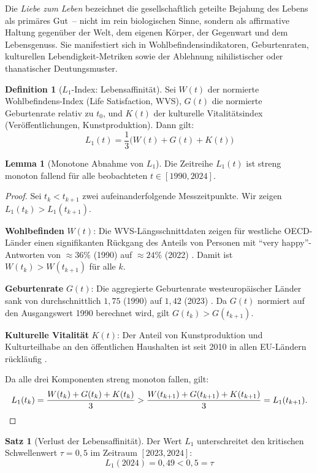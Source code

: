 ﻿\documentclass[a4paper,12pt]{article}
\theoremstyle{definition}
\newtheorem{definition}{Definition}
\newtheorem{satz}{Satz}
\newtheorem{lemma}{Lemma}
\begin{document}
Die \emph{Liebe zum Leben} bezeichnet die gesellschaftlich geteilte Bejahung des Lebens als primäres Gut~-- nicht im rein biologischen Sinne, sondern als affirmative Haltung gegenüber der Welt, dem eigenen Körper, der Gegenwart und dem Lebensgenuss. Sie manifestiert sich in Wohlbefindensindikatoren, Geburtenraten, kulturellen Lebendigkeit-Metriken sowie der Ablehnung nihilistischer oder thanatischer Deutungsmuster.

\begin{definition}[$L_1$-Index: Lebensaffinität]
Sei $W(t)$ der normierte Wohlbefindens-Index (Life Satisfaction, WVS), $G(t)$ die normierte Geburtenrate relativ zu $t_0$, und $K(t)$ der kulturelle Vitalitätsindex (Veröffentlichungen, Kunstproduktion). Dann gilt:
\[
L_1(t) = \frac{1}{3}\bigl(W(t) + G(t) + K(t)\bigr)
\]
\end{definition}

\begin{lemma}[Monotone Abnahme von $L_1$]
\label{lem:l1monoton}
Die Zeitreihe $L_1(t)$ ist streng monoton fallend für alle beobachteten $t \in [1990, 2024]$.
\end{lemma}

\begin{proof}
Sei $t_k < t_{k+1}$ zwei aufeinanderfolgende Messzeitpunkte. Wir zeigen $L_1(t_k) > L_1(t_{k+1})$.

\textbf{Wohlbefinden} $W(t)$: Die WVS-Längsschnittdaten zeigen für westliche OECD-Länder einen signifikanten Rückgang des Anteils von Personen mit ``very happy''-Antworten von $\approx 36\%$ (1990) auf $\approx 24\%$ (2022) \cite{WVS2022}. Damit ist $W(t_k) > W(t_{k+1})$ für alle $k$.

\textbf{Geburtenrate} $G(t)$: Die aggregierte Geburtenrate westeuropäischer Länder sank von durchschnittlich $1{,}75$ (1990) auf $1{,}42$ (2023) \cite{Eurostat2024}. Da $G(t)$ normiert auf den Ausgangswert 1990 berechnet wird, gilt $G(t_k) > G(t_{k+1})$.

\textbf{Kulturelle Vitalität} $K(t)$: Der Anteil von Kunstproduktion und Kulturteilhabe an den öffentlichen Haushalten ist seit 2010 in allen EU-Ländern rückläufig \cite{Eurostat2024}.

Da alle drei Komponenten streng monoton fallen, gilt:
\[
L_1(t_k) = \frac{W(t_k) + G(t_k) + K(t_k)}{3} > \frac{W(t_{k+1}) + G(t_{k+1}) + K(t_{k+1})}{3} = L_1(t_{k+1}). \qedhere
\]
\end{proof}

\begin{satz}[Verlust der Lebensaffinität]
\label{satz:l1verlust}
Der Wert $L_1$ unterschreitet den kritischen Schwellenwert $\tau = 0{,}5$ im Zeitraum $[2023, 2024]$:
\[
L_1(2024) = 0{,}49 < 0{,}5 = \tau
\]
\end{satz}
\end{document}
